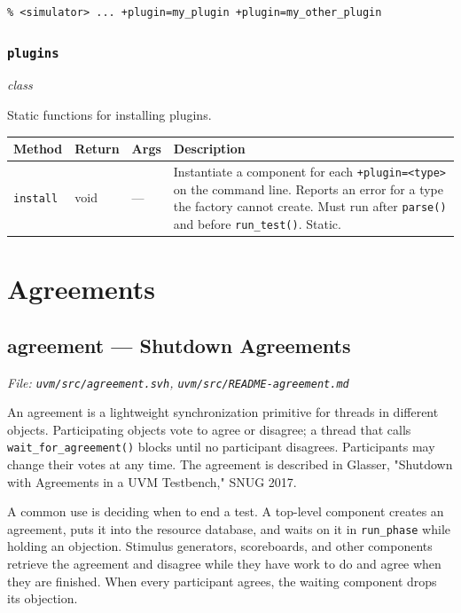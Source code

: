 \documentclass[11pt,letterpaper]{report}
\begin{document}
\begin{verbatim}
% <simulator> ... +plugin=my_plugin +plugin=my_other_plugin
\end{verbatim}

\subsection*{\texttt{plugins}}
\noindent\small\textit{class}\par

Static functions for installing plugins.

\begin{xltabular}{\linewidth}{>{\small}p{1.35in} >{\small}p{1.25in} >{\small}p{0.95in} >{\small}X}
\toprule
\textbf{Method} & \textbf{Return} & \textbf{Args} & \textbf{Description} \\
\midrule
\endhead
\bottomrule
\endfoot
\texttt{install} & void & --- & Instantiate a component for each \texttt{+plugin=\textless{}type\textgreater{}} on the command line. Reports an error for a type the factory cannot create. Must run after \texttt{parse()} and before \texttt{run\_test()}. Static. \\
\end{xltabular}

\chapter{Agreements}
\section{agreement --- Shutdown Agreements}
\noindent\small\textit{File: \texttt{uvm/src/agreement.svh}, \texttt{uvm/src/README-agreement.md}}\par

An agreement is a lightweight synchronization primitive for threads in different objects. Participating objects vote to agree or disagree; a thread that calls \texttt{wait\_for\_agreement()} blocks until no participant disagrees. Participants may change their votes at any time. The agreement is described in Glasser, "Shutdown with Agreements in a UVM Testbench," SNUG 2017.

A common use is deciding when to end a test. A top-level component creates an agreement, puts it into the resource database, and waits on it in \texttt{run\_phase} while holding an objection. Stimulus generators, scoreboards, and other components retrieve the agreement and disagree while they have work to do and agree when they are finished. When every participant agrees, the waiting component drops its objection.
\end{document}
